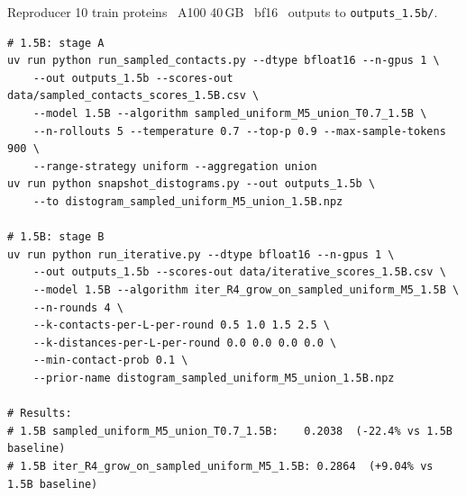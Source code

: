 \documentclass[aspectratio=169,11pt]{beamer}
\newcommand{\codeS}[1]{\texttt{\scriptsize\color{navy}#1}}
\begin{document}
\begin{frame}[fragile]{Reproducer}
  {\footnotesize 10 train proteins \textperiodcentered\ A100 40\,GB
   \textperiodcentered\ bf16 \textperiodcentered\ outputs to
   \codeS{outputs\_1.5b/}.}\par\vspace{0.3em}
  \begin{lstlisting}[style=code,basicstyle=\ttfamily\scriptsize\color{navy}]
# 1.5B: stage A
uv run python run_sampled_contacts.py --dtype bfloat16 --n-gpus 1 \
    --out outputs_1.5b --scores-out data/sampled_contacts_scores_1.5B.csv \
    --model 1.5B --algorithm sampled_uniform_M5_union_T0.7_1.5B \
    --n-rollouts 5 --temperature 0.7 --top-p 0.9 --max-sample-tokens 900 \
    --range-strategy uniform --aggregation union
uv run python snapshot_distograms.py --out outputs_1.5b \
    --to distogram_sampled_uniform_M5_union_1.5B.npz

# 1.5B: stage B
uv run python run_iterative.py --dtype bfloat16 --n-gpus 1 \
    --out outputs_1.5b --scores-out data/iterative_scores_1.5B.csv \
    --model 1.5B --algorithm iter_R4_grow_on_sampled_uniform_M5_1.5B \
    --n-rounds 4 \
    --k-contacts-per-L-per-round 0.5 1.0 1.5 2.5 \
    --k-distances-per-L-per-round 0.0 0.0 0.0 0.0 \
    --min-contact-prob 0.1 \
    --prior-name distogram_sampled_uniform_M5_union_1.5B.npz

# Results:
# 1.5B sampled_uniform_M5_union_T0.7_1.5B:    0.2038  (-22.4% vs 1.5B baseline)
# 1.5B iter_R4_grow_on_sampled_uniform_M5_1.5B: 0.2864  (+9.04% vs 1.5B baseline)
  \end{lstlisting}
\end{frame}
\end{document}
